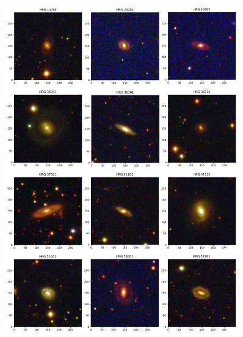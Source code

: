\begin{anexosenv}
    \begin{figure}[h]
        \centering 
        \includegraphics[width=0.9\textwidth]{Imagens/imagem_08.png} 
        \caption[]{}
        \label{fig:imagem_08} 
    \end{figure}


\end{anexosenv}
